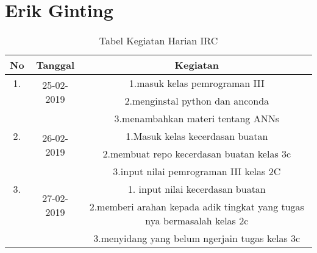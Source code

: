 \chapter{Erik Ginting}

\begin{table}[h]
\caption{Tabel Kegiatan Harian IRC}
\centering
\begin{tabular}{|c|c|c|}
\hline
No&Tanggal&Kegiatan\\
\hline
1.&\multirow{2}{*}{25-02-2019}&1.masuk kelas pemrograman III\\
&&2.menginstal python dan anconda\\ 
&&3.menambahkan materi tentang ANNs\\
\hline
2.&\multirow{2}{*}{26-02-2019}&1.Masuk kelas kecerdasan buatan\\
&&2.membuat repo kecerdasan buatan kelas 3c\\
&&3.input nilai pemrograman III kelas 2C\\
\hline
3.&\multirow{2}{*}{27-02-2019}&1. input nilai kecerdasan buatan\\
&&2.memberi arahan kepada adik tingkat yang tugas nya bermasalah kelas 2c\\
&&3.menyidang yang belum ngerjain tugas kelas 3c\\
\hline
\end{tabular}
\label{table:contoh}
\end{table} 

